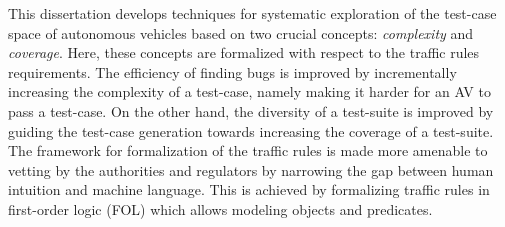 This dissertation develops techniques for systematic exploration of the test-case space of autonomous vehicles based on two crucial concepts: \emph{complexity} and \emph{coverage}.
%
Here, these concepts are formalized with respect to the traffic rules requirements.
%
The efficiency of finding bugs is improved by incrementally increasing the complexity of a test-case, namely making it harder for an AV to pass a test-case.
%
On the other hand, the diversity of a test-suite is improved by guiding the test-case generation towards increasing the coverage of a test-suite.
%
The framework for formalization of the traffic rules is made more amenable to vetting by the authorities and regulators by narrowing the gap between human intuition and machine language.
%
This is achieved by formalizing traffic rules in first-order logic (FOL) which allows modeling objects and predicates.
\clearpage



